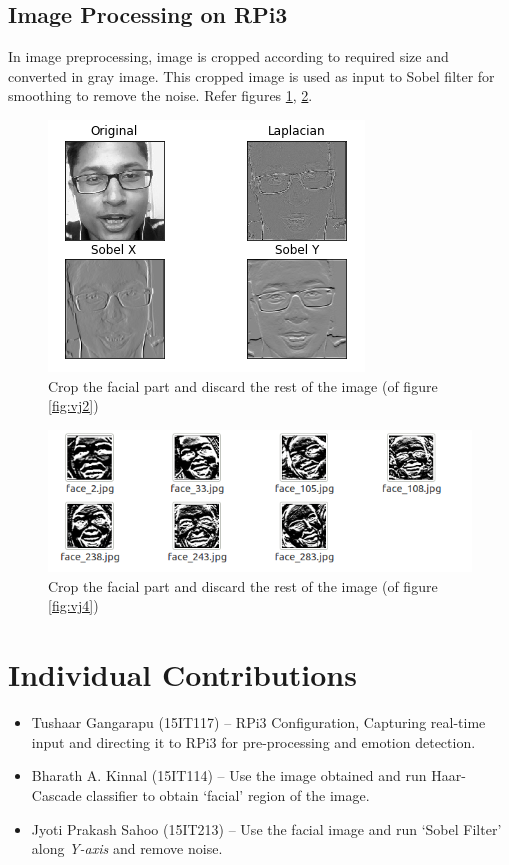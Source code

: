 \subsection{Image Processing on RPi3}
In image preprocessing, image is cropped according to required size and converted in gray image. This cropped image is used as input to Sobel filter for smoothing to remove the noise. Refer figures \ref{fig:ip1}, \ref{fig:ip2}.

\begin{figure}[htb]
\centering
\includegraphics[scale=0.5]{images/ip_img1}
\caption{Crop the facial part and discard the rest of the image (of figure \ref{fig:vj2})}
\label{fig:ip1}
\end{figure}

\begin{figure}[htb]
\centering
\includegraphics[scale=0.5]{images/ip_img2}
\caption{Crop the facial part and discard the rest of the image (of figure \ref{fig:vj4})}
\label{fig:ip2}
\end{figure}
\pagebreak

\section{Individual Contributions}

\begin{itemize}
\item Tushaar Gangarapu (15IT117) -- RPi3 Configuration, Capturing real-time input and directing it to RPi3 for pre-processing and emotion detection.
\item Bharath A. Kinnal (15IT114) -- Use the image obtained and run Haar-Cascade classifier to obtain `facial' region of the image.
\item Jyoti Prakash Sahoo (15IT213) -- Use the facial image and run `Sobel Filter' along \textit{Y-axis} and remove noise.
\end{itemize}